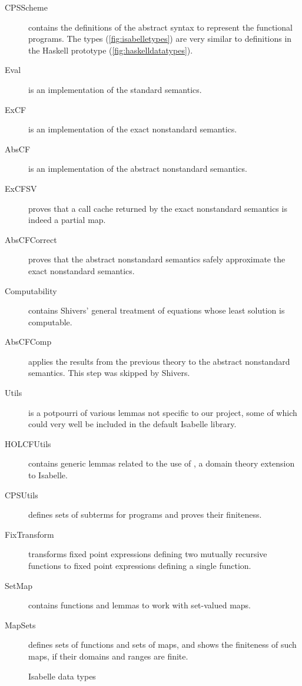 \documentclass[a4paper,halfparskip,DIV=10,11pt]{scrbook}
\begin{document}
\begin{description}
\setlength\parskip{0pt}
\item[CPSScheme] contains the definitions of the abstract syntax to represent the functional programs. The types (\vref{fig:isabelletypes}) are very similar to definitions in the Haskell prototype (\vref{fig:haskelldatatypes}).
\item[Eval] is an implementation of the standard semantics.
\item[ExCF] is an implementation of the exact nonstandard semantics.
\item[AbsCF] is an implementation of the abstract nonstandard semantics.
\vspace{1em}
\item[ExCFSV] proves that a call cache returned by the exact nonstandard semantics is indeed a partial map.
\item[AbsCFCorrect] proves that the abstract nonstandard semantics safely approximate the exact nonstandard semantics.
\item[Computability] contains Shivers’ general treatment of equations whose least solution is computable.
\item[AbsCFComp] applies the results from the previous theory to the abstract nonstandard semantics. This step was skipped by Shivers.
\vspace{1em}
\item[Utils] is a potpourri of various lemmas not specific to our project, some of which could very well be included in the default Isabelle library.
\item[HOLCFUtils] contains generic lemmas related to the use of , a domain theory extension to Isabelle.
\item[CPSUtils] defines sets of subterms for programs and proves their finiteness.
\item[FixTransform] transforms fixed point expressions defining two mutually recursive functions to fixed point expressions defining a single function.
\item[SetMap] contains functions and lemmas to work with set-valued maps.
\item[MapSets] defines sets of functions and sets of maps, and shows the finiteness of such maps, if their domains and ranges are finite.
\end{description}

\begin{figure}
\begin{framed}

\end{framed}
\caption{Isabelle data types}
\label{fig:isabelletypes}
\end{figure}
\end{document}
